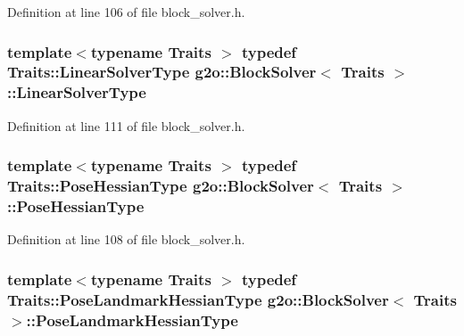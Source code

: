 Definition at line 106 of file block\+\_\+solver.\+h.

\subsubsection[{\texorpdfstring{Linear\+Solver\+Type}{LinearSolverType}}]{\setlength{\rightskip}{0pt plus 5cm}template$<$typename Traits $>$ typedef Traits\+::\+Linear\+Solver\+Type {\bf g2o\+::\+Block\+Solver}$<$ Traits $>$\+::{\bf Linear\+Solver\+Type}}\hypertarget{classg2o_1_1BlockSolver_a717fa8cb1dd5a212e41d8ebef67955e6}{}\label{classg2o_1_1BlockSolver_a717fa8cb1dd5a212e41d8ebef67955e6}


Definition at line 111 of file block\+\_\+solver.\+h.

\subsubsection[{\texorpdfstring{Pose\+Hessian\+Type}{PoseHessianType}}]{\setlength{\rightskip}{0pt plus 5cm}template$<$typename Traits $>$ typedef Traits\+::\+Pose\+Hessian\+Type {\bf g2o\+::\+Block\+Solver}$<$ Traits $>$\+::{\bf Pose\+Hessian\+Type}}\hypertarget{classg2o_1_1BlockSolver_a0e7f862860a1e3391cec3cfaf69c48be}{}\label{classg2o_1_1BlockSolver_a0e7f862860a1e3391cec3cfaf69c48be}


Definition at line 108 of file block\+\_\+solver.\+h.

\subsubsection[{\texorpdfstring{Pose\+Landmark\+Hessian\+Type}{PoseLandmarkHessianType}}]{\setlength{\rightskip}{0pt plus 5cm}template$<$typename Traits $>$ typedef Traits\+::\+Pose\+Landmark\+Hessian\+Type {\bf g2o\+::\+Block\+Solver}$<$ Traits $>$\+::{\bf Pose\+Landmark\+Hessian\+Type}}\hypertarget{classg2o_1_1BlockSolver_aed8b44e394d2f19ca03c87adf90cc97c}{}\label{classg2o_1_1BlockSolver_aed8b44e394d2f19ca03c87adf90cc97c}


